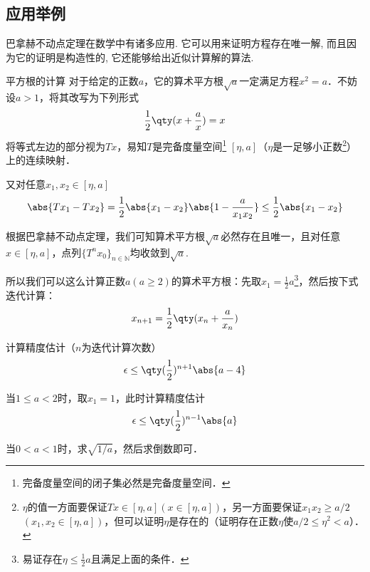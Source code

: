 \subsection{应用举例}
巴拿赫不动点定理在数学中有诸多应用. 它可以用来证明方程存在唯一解, 而且因为它的证明是构造性的, 它还能够给出近似计算解的算法.

\begin{example}{平方根的计算}
对于给定的正数$a$，它的算术平方根$\sqrt{a}$一定满足方程$x^2=a$．不妨设$a>1$，将其改写为下列形式
\begin{equation}
\frac{1}{2}\qty(x+\frac{a}{x})=x
\end{equation}
将等式左边的部分视为$Tx$，易知$T$是完备度量空间\footnote{完备度量空间的闭子集必然是完备度量空间．} $[\eta,a]$（$\eta$是一足够小正数\footnote{$\eta$的值一方面要保证$Tx\in[\eta,a](x\in[\eta,a])$，另一方面要保证$x_1x_2 \geq a/2$ $(x_1,x_2\in[\eta,a])$，但可以证明$\eta$是存在的（证明存在正数$\eta$使$a/2\leq \eta^2<a$）．}）上的连续映射．

又对任意$x_1,x_2\in [\eta,a]$
\begin{equation}
\abs{Tx_1 -  Tx_2}=\frac{1}{2}\abs{x_1 - x_2}\abs{1-\frac{a}{x_1x_2}}\leq\frac{1}{2}\abs{x_1 - x_2}
\end{equation}

根据巴拿赫不动点定理，我们可知算术平方根$\sqrt{a}$必然存在且唯一，且对任意$x\in[\eta,a]$，点列$\{T^nx_0\}_{n\in\mathbb{N}}$均收敛到$\sqrt{a}$.

所以我们可以这么计算正数$a(a\geq 2)$的算术平方根：先取$x_1=\frac{1}{2}a$\footnote{易证存在$\eta\leq\frac{1}{2}a$且满足上面的条件．}，然后按下式迭代计算：
\begin{equation}
x_{n+1}=\frac{1}{2}\qty(x_n+\frac{a}{x_n})
\end{equation}

计算精度估计（$n$为迭代计算次数）
\begin{equation}
\epsilon\leq\qty(\frac{1}{2})^{n+1}\abs{a-4}
\end{equation}

当$1\leq a<2$时，取$x_1=1$，此时计算精度估计
\begin{equation}
\epsilon\leq\qty(\frac{1}{2})^{n-1}\abs{a}
\end{equation}

当$0<a<1$时，求$\sqrt{1/a}$，然后求倒数即可．
\end{example}
